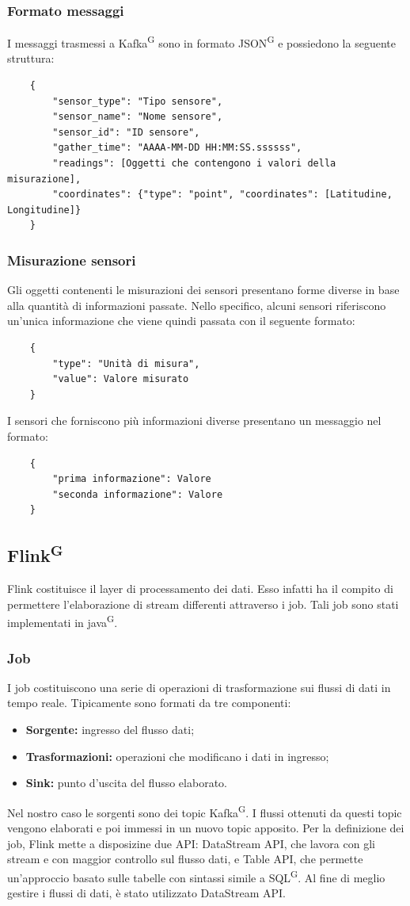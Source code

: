 \documentclass[8pt]{article}
\newcommand{\glossterm}[1]{#1\textsuperscript{G}} %
\begin{document}
\subsubsection{Formato messaggi}
I messaggi trasmessi a \glossterm{Kafka} sono in formato \glossterm{JSON} e possiedono la seguente struttura:
\begin{verbatim}
    {
        "sensor_type": "Tipo sensore",
        "sensor_name": "Nome sensore",
        "sensor_id": "ID sensore",
        "gather_time": "AAAA-MM-DD HH:MM:SS.ssssss",
        "readings": [Oggetti che contengono i valori della misurazione],
        "coordinates": {"type": "point", "coordinates": [Latitudine, Longitudine]}
    }
\end{verbatim}
\subsubsection{Misurazione sensori}
Gli oggetti contenenti le misurazioni dei sensori presentano forme diverse in base alla quantità di informazioni passate. Nello specifico, alcuni sensori riferiscono un'unica informazione che viene quindi passata con il seguente formato:
\begin{verbatim}
    {
        "type": "Unità di misura", 
        "value": Valore misurato
    }
\end{verbatim}
I sensori che forniscono più informazioni diverse presentano un messaggio nel formato:
\begin{verbatim}
    {
        "prima informazione": Valore
        "seconda informazione": Valore
    }
\end{verbatim}
\clearpage
\subsection{\glossterm{Flink}}
Flink costituisce il layer di processamento dei dati. Esso infatti ha il compito di permettere l'elaborazione di stream differenti attraverso i job.  Tali job sono stati implementati in \glossterm{java}.
\subsubsection{Job}
I job costituiscono una serie di operazioni di trasformazione sui flussi di dati in tempo reale. Tipicamente sono formati da tre componenti:
\begin{itemize}
    \item \textbf{Sorgente:} ingresso del flusso dati;
    \item \textbf{Trasformazioni:} operazioni che modificano i dati in ingresso;
    \item \textbf{Sink:} punto d'uscita del flusso elaborato.
\end{itemize}
Nel nostro caso le sorgenti sono dei topic \glossterm{Kafka}. I flussi ottenuti da questi topic vengono elaborati e poi immessi in un nuovo topic apposito.
Per la definizione dei job, Flink mette a disposizine due API: DataStream API, che lavora con gli stream e con maggior controllo sul flusso dati, e Table API, che permette un'approccio basato sulle tabelle con sintassi simile a \glossterm{SQL}.
Al fine di meglio gestire i flussi di dati, è stato utilizzato DataStream API.
\end{document}
